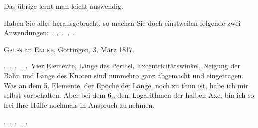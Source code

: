 \begin{landscape}
\begin{center}
\end{center}
\par\noindent Das übrige lernt man leicht auswendig.
\par\noindent\hspace*{\parindent}Haben Sie alles herausgebracht, so machen Sie doch einstweilen folgende
zwei Anwendungen: .\ .\ .\ .\ .
\par\medskip
\begin{center}\textsc{Gauss} an \textsc{Encke}, Göttingen, 3. März 1817.\end{center}
\par\noindent\hspace*{\parindent}.\ .\ .\ .\ .\ Vier Elemente, Länge des Perihel, Excentricitätswinkel, Neigung
der Bahn und Länge des Knoten sind nunmehro ganz abgemacht und eingetragen. Was an dem 5. Elemente, der Epoche der Länge, noch zu thun
ist, habe ich mir selbst vorbehalten. Aber bei dem 6., dem Logarithmen
der halben Axe, bin ich so frei Ihre Hülfe nochmals in Anspruch zu nehmen.
\par\noindent .\ .\ .\ .\ .
\clearpage
\endgroup
\end{landscape}
